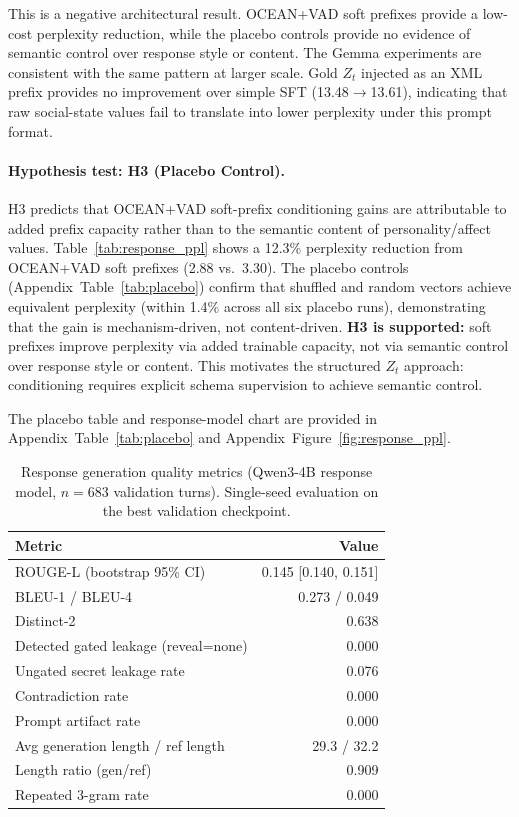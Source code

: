 \documentclass[11pt]{article}
\begin{document}
This is a negative architectural result. OCEAN+VAD soft prefixes provide a low-cost perplexity reduction, while the placebo controls provide no evidence of semantic control over response style or content.
The Gemma experiments are consistent with the same pattern at larger scale. Gold $Z_t$ injected as an XML prefix provides no improvement over simple SFT (13.48$\to$13.61), indicating that raw social-state values fail to translate into lower perplexity under this prompt format.

\paragraph{Hypothesis test: H3 (Placebo Control).}
H3 predicts that OCEAN+VAD soft-prefix conditioning gains are attributable to added prefix capacity rather than to the semantic content of personality/affect values. Table~\ref{tab:response_ppl} shows a 12.3\% perplexity reduction from OCEAN+VAD soft prefixes (2.88 vs.~3.30). The placebo controls (Appendix~Table~\ref{tab:placebo}) confirm that shuffled and random vectors achieve equivalent perplexity (within 1.4\% across all six placebo runs), demonstrating that the gain is mechanism-driven, not content-driven. \textbf{H3 is supported:} soft prefixes improve perplexity via added trainable capacity, not via semantic control over response style or content. This motivates the structured $Z_t$ approach: conditioning requires explicit schema supervision to achieve semantic control.

The placebo table and response-model chart are provided in Appendix~Table~\ref{tab:placebo} and Appendix~Figure~\ref{fig:response_ppl}.

\begin{table}[t]
\centering
\caption{Response generation quality metrics (Qwen3-4B response model, $n=683$ validation turns). Single-seed evaluation on the best validation checkpoint.}
\label{tab:response_quality}
\small
\begin{tabularx}{\linewidth}{@{}Xr@{}}
\toprule
\textbf{Metric} & \textbf{Value} \\
\midrule
ROUGE-L (bootstrap 95\% CI) & 0.145 [0.140, 0.151] \\
BLEU-1 / BLEU-4 & 0.273 / 0.049 \\
Distinct-2 & 0.638 \\
Detected gated leakage (reveal=none) & 0.000 \\
Ungated secret leakage rate & 0.076 \\
Contradiction rate & 0.000 \\
Prompt artifact rate & 0.000 \\
Avg generation length / ref length & 29.3 / 32.2 \\
Length ratio (gen/ref) & 0.909 \\
Repeated 3-gram rate & 0.000 \\
\bottomrule
\end{tabularx}
\end{table}
\end{document}
